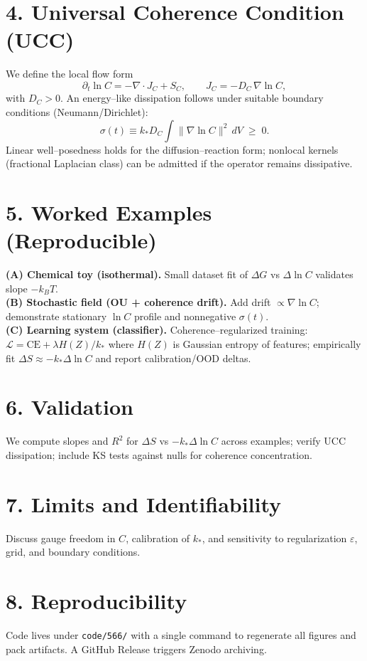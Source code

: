 \documentclass[10pt]{article}
\begin{document}
\section*{4. Universal Coherence Condition (UCC)}
We define the local flow form
\begin{equation}
 \partial_t \ln C = -\nabla\!\cdot J_C + S_C, \qquad J_C = -D_C\,\nabla \ln C,
\end{equation}
with $D_C\!>\!0$. An energy–like dissipation follows under suitable boundary conditions (Neumann/Dirichlet):
\begin{equation}
 \sigma(t) \equiv k_* D_C \int \|\nabla \ln C\|^2\, dV \;\ge\; 0.
\end{equation}
Linear well–posedness holds for the diffusion–reaction form; nonlocal kernels (fractional Laplacian class) can be admitted if the operator remains dissipative.

\section*{5. Worked Examples (Reproducible)}
\textbf{(A) Chemical toy (isothermal).} Small dataset fit of $\Delta G$ vs $\Delta\ln C$ validates slope $-k_BT$.\\
\textbf{(B) Stochastic field (OU + coherence drift).} Add drift $\propto \nabla\ln C$; demonstrate stationary $\ln C$ profile and nonnegative $\sigma(t)$.\\
\textbf{(C) Learning system (classifier).} Coherence–regularized training: $\mathcal{L}=\mathrm{CE}+\lambda H(Z)/k_*$ where $H(Z)$ is Gaussian entropy of features; empirically fit $\Delta S\approx -k_*\Delta\ln C$ and report calibration/OOD deltas.

\section*{6. Validation}
We compute slopes and $R^2$ for $\Delta S$ vs $-k_*\Delta\ln C$ across examples; verify UCC dissipation; include KS tests against nulls for coherence concentration.

\section*{7. Limits and Identifiability}
Discuss gauge freedom in $C$, calibration of $k_*$, and sensitivity to regularization $\varepsilon$, grid, and boundary conditions.

\section*{8. Reproducibility}
Code lives under \texttt{code/566/} with a single command to regenerate all figures and pack artifacts. A GitHub Release triggers Zenodo archiving.
\end{document}
